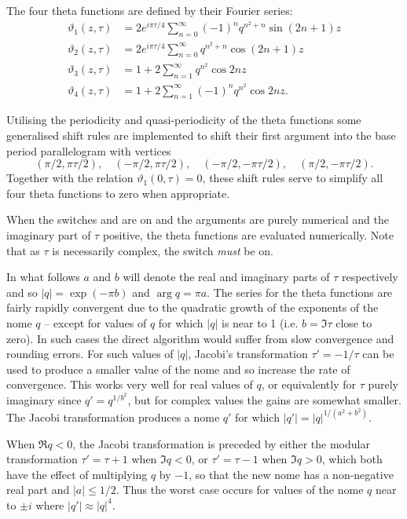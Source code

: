 The four theta functions are defined by their Fourier series:
\begin{align*}
  \vartheta_1(z,\tau) & = 2 e^{i\pi\tau/4}\sum_{n=0}^\infty (-1)^nq^{n^2+n} \sin(2n+1)z\\
\vartheta_2(z,\tau) & = 2 e^{i\pi\tau/4}\sum_{n=0}^\infty q^{n^2+n} \cos(2n+1)z\\
\vartheta_3(z,\tau) & = 1 +2\sum_{n=1}^\infty q^{n^2} \cos 2n z\\
\vartheta_4(z,\tau) & = 1 +2\sum_{n=1}^\infty (-1)^n q^{n^2} \cos 2n z.
\end{align*}

Utilising the periodicity and quasi-periodicity of the theta functions
some generalised shift rules are implemented to shift their first argument
into the base period parallelogram with vertices
\[(\pi/2, \pi\tau/2),\quad (-\pi/2, \pi\tau/2),\quad (-\pi/2, -\pi\tau/2),
\quad (\pi/2, -\pi\tau/2).\]
Together with the relation $\vartheta_1(0,\tau)=0$,  these shift rules serve to
simplify all four theta functions to zero when appropriate.

When the switches  and  are on and the arguments are
purely numerical and the imaginary part of $\tau$ positive,
the theta functions are evaluated numerically. Note that as $\tau$ is
necessarily complex, the switch  \emph{must} be on.

In what follows $a$ and $b$ will denote the real and imaginary parts of
$\tau$ respectively and so $|q| = \exp(-\pi b)$ and $\arg q =\pi a$.
The series for the theta functions are fairly rapidly convergent
due to the quadratic growth of the exponents of the nome $q$ -- except
for values of $q$ for which $|q|$ is near to 1
(i.e. $b=\Im \tau $ close to zero).
In such cases the direct algorithm would suffer from slow convergence and
rounding errors.
For such values of $|q|$, Jacobi's transformation $\tau'=-1/\tau$ can be
used to produce a smaller value of the nome and so increase the rate of
convergence.
This works very well for real values of $q$, or equivalently for $\tau$ purely
imaginary since $q'= q^{1/b^2}$, but for complex
values the gains are somewhat smaller. The Jacobi transformation produces a
nome $q'$ for which $|q'| =  |q|^{1/(a^2+b^2)}$.

When $\Re q < 0$, the Jacobi transformation is preceded by either the
modular transformation $\tau' = \tau+1$ when $\Im q < 0$, or $\tau' = \tau-1$
when $\Im q > 0$, which both have the effect  of multiplying $q$ by $-1$,
so that the new nome has a non-negative real part and $|a| \leq 1/2$.
Thus the worst case occurs for values of the nome $q$ near to $\pm i$ where
$|q'| \approx |q|^4$.

